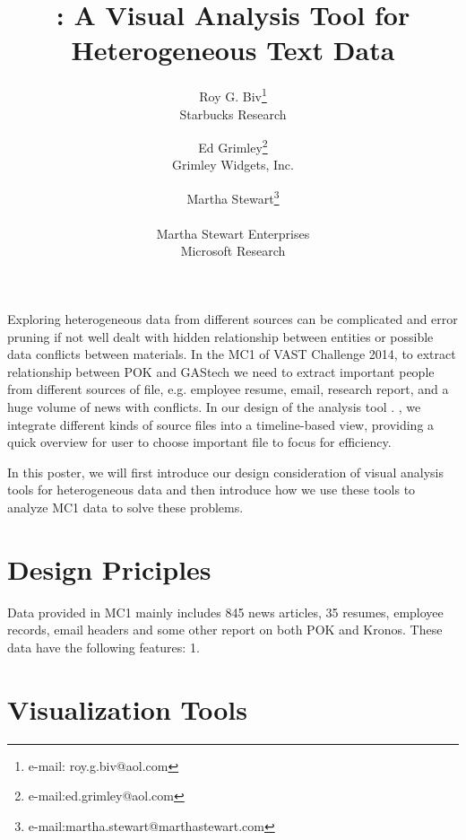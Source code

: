 \documentclass{vgtc}                          %
\title{\projectname: A Visual Analysis Tool for Heterogeneous Text Data}
\author{Roy G. Biv\thanks{e-mail: roy.g.biv@aol.com}\\ %
        \scriptsize Starbucks Research %
\and Ed Grimley\thanks{e-mail:ed.grimley@aol.com}\\ %
     \scriptsize Grimley Widgets, Inc. %
\and Martha Stewart\thanks{e-mail:martha.stewart@marthastewart.com}\\ %
     \parbox{1.4in}{\scriptsize \centering Martha Stewart Enterprises \\ Microsoft Research}}
\begin{document}


\maketitle

Exploring heterogeneous data from different sources can be complicated and error pruning if not well dealt with hidden relationship between entities or possible data conflicts between materials. 
In the MC1 of VAST Challenge 2014, to extract relationship between POK and GAStech we need to extract important people from different sources of file, e.g. employee resume, email, research report, and a huge volume of news with conflicts. 
In our design of the analysis tool \projectname. , we integrate different kinds of source files into a timeline-based view, providing a quick overview for user to choose important file to focus for efficiency. 
\par
In this poster, we will first introduce our design consideration of visual analysis tools for heterogeneous data and then introduce how we use these tools to analyze MC1 data to solve these problems.


\section{Design Priciples}
Data provided in MC1 mainly includes 845 news articles, 35 resumes, employee records, email headers and some other report on both POK and Kronos. These data have the following features: 1. 


\section{Visualization Tools}
\end{document}
